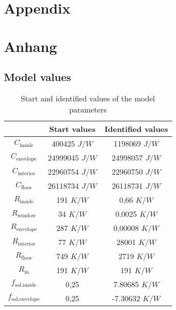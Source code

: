 

{\chapter{Appendix}}    %
{\chapter{Anhang}}      %
\label{chap:appendix}

\section{Model values}
\label{sec:appendix:Modelvalues}
\begin{table}[!]
    \centering
    \begin{tabular}{c|c|c}
         &  Start values & Identified values\\
         \hline
        $C_\text{inside}$& 400425 $J/W$ & 1198069 $J/W$\\
        $C_\text{envelope}$ & 24999045 $J/W$ & 24998057 $J/W$\\
        $C_\text{interior}$& 22960754 $J/W$ & 22960750 $J/W$\\
        $C_\text{floor}$ & 26118734 $J/W$ & 26118731 $J/W$\\
        $R_\text{inside}$ & 191 $K/W$ & 0,66 $K/W$\\
        $R_\text{window}$ & 34 $K/W$ & 0.0025 $K/W$\\
        $R_\text{envelope}$ & 287 $K/W$ & 0,00008 $K/W$\\
        $R_\text{interior}$& 77 $K/W$ & 28001 $K/W$\\
        $R_\text{floor}$ & 749 $K/W$ & 2719 $K/W$\\
        $R_\text{in}$ & 191 $K/W$ & 191 $K/W$\\
        $f_\text{sol,inside}$ & 0,25 & 7.80685 $K/W$\\
        $f_\text{sol,envelope}$ &0,25 & -7.30632 $K/W$\\
    \end{tabular}
    \caption{Start and identified values of the model parameters}
    \label{tab:my_label}
\end{table}
